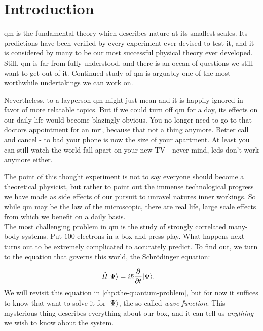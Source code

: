 \documentclass[Thesis.tex]{subfiles}
\begin{document}
\chapter{Introduction}
\label{chp:introduction}

\Gls{qm} is the fundamental theory which describes nature at its
smallest scales. Its predictions have been verified by every experiment ever
devised to test it, and it is considered by many to be our most successful physical
theory ever developed. Still, \gls{qm} is far from fully understood, and there is an ocean of
questions we still want to get out of it. Continued study of \gls{qm} is arguably one
of the most worthwhile undertakings we can work on.

Nevertheless, to a layperson \acrshort{qm} might just mean  and it
is happily ignored in favor of more relatable topics. But if we could turn off \gls{qm}
for a day, its effects on our daily life would become blazingly obvious. You no
longer need to go to that doctors appointment for an \acrshort{mri}, because that not a
thing anymore. Better call and cancel - to bad your phone is now the size of
your apartment. At least you can still watch the world fall apart on your new TV -
never mind, \acrshort{led}s don't work anymore either.

The point of this thought experiment is not to say everyone should become a
theoretical physicist, but rather to point out the immense technological
progress we have made as side effects of our pursuit to unravel natures inner
workings. So while \acrshort{qm} may be the law of the microscopic, there are
real life, large scale effects from which we benefit on a daily basis.\\

The most challenging problem in \gls{qm} is the study of strongly correlated
many-body systems. Put $\num{100}$ electrons in a box and press play. What happens next
turns out to be extremely complicated to accurately predict. To find out, we
turn to the equation that governs this world, the Schrödinger equation:

\begin{align}
  \label{eq:schrodinger-intro-def}
  \hat H| \Psi \rangle &= i\hbar \pdv{}{t}| \Psi \rangle.
\end{align}
We will revisit this equation in \cref{chp:the-quantum-problem}, but for now it
suffices to know that want to solve it for $| \Psi \rangle$, the so called \emph{wave
function}. This mysterious thing describes everything about our box, and it can
tell us \emph{anything} we wish to know about the system.
\end{document}
